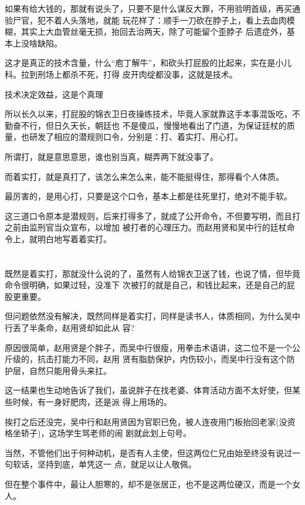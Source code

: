\documentclass[11pt,a4paper,onecolumn]{article}
\begin{document}
如果有给大钱的，那就有说头了，只要不是什么谋反大罪，不用验明首级，再买通验尸官，犯不着人头落地，就能
玩花样了：顺手一刀砍在脖子上，看上去血肉模糊，其实上大血管丝毫无损，抬回去治两天，除了可能留个歪脖子
后遗症外，基本上没啥缺陷。

这才是真正的技术含量，什么``庖丁解牛''，和砍头打屁股的比起来，实在是小儿科。拉到刑场上都杀不死，打得
皮开肉绽都没事，这就是技术。

技术决定效益，这是个真理

所以长久以来，打屁股的锦衣卫日夜操练技术，毕竟人家就靠这手本事混饭吃，不勤奋不行，但日久天长，朝廷也
不是傻瓜，慢慢地看出了门道，为保证廷杖的质量，也研发了相应的潜规则口令，分别是：打、着实打、用心打。

所谓打，就是意思意思，谁也别当真，糊弄两下就没事了。

而着实打，就是真打了，该怎么来怎么来，能不能挺得住，那得看个人体质。

最厉害的，是用心打，只要是这个口令，基本上都是往死里打，绝对不能手软。

这三道口令原本是潜规则，后来打得多了，就成了公开命令，不但要写明，而且打之前由监刑官当众宣布，以增加
被打者的心理压力。而赵用贤和吴中行的廷杖命令上，就明白地写着着实打。

\section[\thesection]{}

既然是着实打，那就没什么说的了，虽然有人给锦衣卫送了钱，也说了情，但毕竟命令很明确，如果过轻，没准下
次被打的就是自己，和钱比起来，还是自己的屁股更重要。

但问题依然没有解决，既然同样是着实打，同样是读书人，体质相同，为什么吴中行丢了半条命，赵用贤却如此从
容?

原因很简单，赵用贤是个胖子，而吴中行很瘦，用拳击术语讲，这二位不是一个公斤级的，抗击打能力不同，赵用
贤有脂肪保护，内伤较小，而吴中行没有这个防护层，自然只能用骨头来扛。

这一结果也生动地告诉了我们，虽说胖子在找老婆、体育活动方面不太好使，但某些时候，有一身好肥肉，还是派
得上用场的。

挨打之后还没完，吴中行和赵用贤因为官职已免，被人连夜用门板抬回老家(没资格坐轿子)，这场学生骂老师的闹
剧就此划上句号。

当然，不管他们出于何种动机，是否有人主使，但这两位仁兄由始至终没有说过一句软话，坚持到底，单凭这一
点，就足以让人敬佩。

但在整个事件中，最让人胆寒的，却不是张居正，也不是这两位硬汉，而是一个女人。
\end{document}
